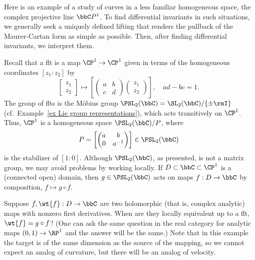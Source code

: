 \begin{example}\label{ex projective structures and schwarzians}
    Here is an example of a study of curves in a less familiar homogeneous space, the complex projective line $\bbC  P^1$. To find differential invariants in such situations, we generally seek a uniquely defined lifting that renders the pullback of the Maurer-Cartan form as simple as possible. Then, after finding differential invariants, we interpret them.

    Recall that a \gls{flt} is a map $\CP^1\to \CP^1$ given in terms of the homogeneous coordinates $[z_1:z_2]$ by 
    \[
        \begin{bmatrix}
            z_1\\z_2
        \end{bmatrix}
        \mapsto \left[\begin{pmatrix}
            a & b\\
            c& d
        \end{pmatrix}
        \begin{pmatrix}
            z_1\\z_2
        \end{pmatrix}\right],\quad ad-bc=1.
    \]
    The group of \glspl{flt} is the M\"obius group $\PSL_2(\bbC)=\SL_2(\bbC)\slash \{\pm \rmI\}$ (cf.\ Example~\ref{ex Lie group representations}), which acts transitively on $\CP^1$.  Thus, $\CP^1$ is a homogeneous space $\PSL_2(\bbC)\slash P$, where 
    \[P=\left[
        \begin{pmatrix}
            a & b \\
            0 & a^{-1}
        \end{pmatrix}
    \right]\in\PSL_2(\bbC)\]
    is the stabilizer of $[1:0]$. Although $\PSL_2(\bbC)$, as presented, is not a matrix group, we may avoid problems by working locally. If $D\subset \bbC\subset\CP^1$ is a (connected open) domain, then $g\in\PSL_2(\bbC)$ acts on maps $f:D\to \bbC$ by composition, $f\mapsto g\circ f$.

    Suppose $f,\wt{f}:D\to \bbC$ are two holomorphic (that is, complex analytic) maps with nonzero first derivatives. When are they locally equivalent up to a \gls{flt}, $\wt{f}=g\circ f$? (One can ask the same question in the real category for analytic maps $(0,1)\to \RP^1$ and the answer will be the same.) Note that in this example the target is of the same dimension as the source of the mapping, so we cannot expect an analog of curvature, but there will be an analog of velocity.


\end{example}
